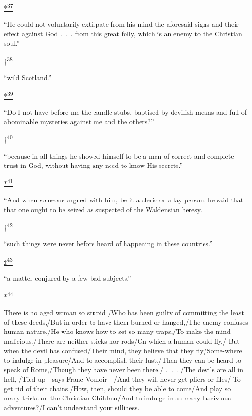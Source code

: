 \protect\hypertarget{23_NOTES.xhtmlux5cux23id_2636}{\protect\hyperlink{18_Chapter_Eleven__THE_FORMS_OF_THO.xhtmlux5cux23id_2635}{*\textsuperscript{37}}}
``He could not voluntarily extirpate from his mind the aforesaid signs
and their effect against God .~.~. from this great folly, which is an
enemy to the Christian soul.''

\protect\hypertarget{23_NOTES.xhtmlux5cux23id_2638}{\protect\hyperlink{18_Chapter_Eleven__THE_FORMS_OF_THO.xhtmlux5cux23id_2637}{†\textsuperscript{38}}}
``wild Scotland.''

\protect\hypertarget{23_NOTES.xhtmlux5cux23id_2640}{\protect\hyperlink{18_Chapter_Eleven__THE_FORMS_OF_THO.xhtmlux5cux23id_2639}{*\textsuperscript{39}}}
``Do I not have before me the candle stubs, baptised by devilish means
and full of abominable mysteries against me and the others?''

\protect\hypertarget{23_NOTES.xhtmlux5cux23id_2642}{\protect\hyperlink{18_Chapter_Eleven__THE_FORMS_OF_THO.xhtmlux5cux23id_2641}{†\textsuperscript{40}}}
``because in all things he showed himself to be a man of correct and
complete trust in God, without having any need to know His secrets.''

\protect\hypertarget{23_NOTES.xhtmlux5cux23id_2644}{\protect\hyperlink{18_Chapter_Eleven__THE_FORMS_OF_THO.xhtmlux5cux23id_2643}{*\textsuperscript{41}}}
``And when someone argued with him, be it a cleric or a lay person, he
said that that one ought to be seized as suspected of the Waldensian
heresy.

\protect\hypertarget{23_NOTES.xhtmlux5cux23id_2646}{\protect\hyperlink{18_Chapter_Eleven__THE_FORMS_OF_THO.xhtmlux5cux23id_2645}{†\textsuperscript{42}}}
``such things were never before heard of happening in these countries.''

\protect\hypertarget{23_NOTES.xhtmlux5cux23id_2648}{\protect\hyperlink{18_Chapter_Eleven__THE_FORMS_OF_THO.xhtmlux5cux23id_2647}{‡\textsuperscript{43}}}
``a matter conjured by a few bad subjects.''

\protect\hypertarget{23_NOTES.xhtmlux5cux23id_2650}{\protect\hyperlink{18_Chapter_Eleven__THE_FORMS_OF_THO.xhtmlux5cux23id_2649}{*\textsuperscript{44}}}
There is no aged woman so stupid /Who has been guilty of committing the
least of these deeds,/But in order to have them burned or hanged,/The
enemy confuses human nature./He who knows how to set so many traps,/To
make the mind malicious./There are neither sticks nor rods/On which a
human could fly,/ But when the devil has confused/Their mind, they
believe that they fly/Some-where to indulge in pleasure/And to
accomplish their lust./Then they can be heard to speak of Rome,/Though
they have never been there./ .~.~. /The devils are all in hell, /Tied
up---says Franc-Vouloir---/And they will never get pliers or files/ To
get rid of their chains./How, then, should they be able to come/And play
so many tricks on the Christian Children/And to indulge in so many
lascivious adventures?/I can't understand your silliness.

